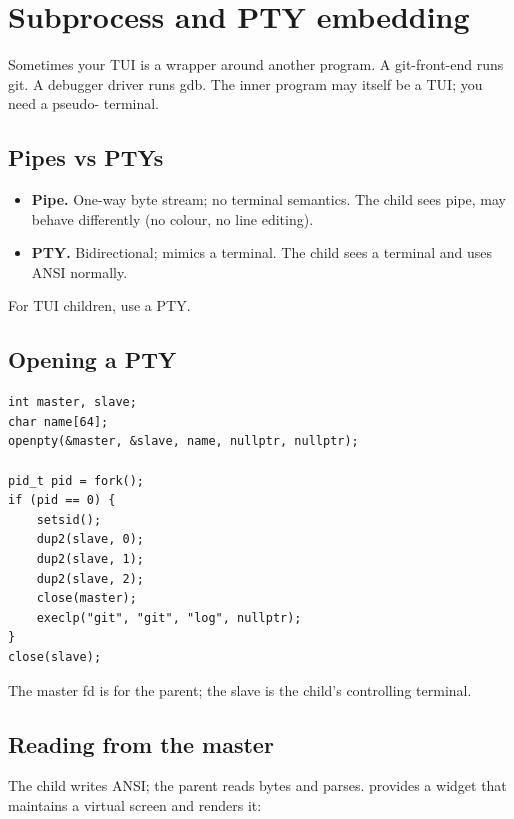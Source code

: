 \chapter{Subprocess and PTY embedding}
\label{ch:pty}

\begin{aside}
Sometimes your TUI is a wrapper around another program.
A git-front-end runs git. A debugger driver runs gdb. The
inner program may itself be a TUI; you need a pseudo-
terminal.
\end{aside}

\section{Pipes vs PTYs}

\begin{itemize}[leftmargin=*]
  \item \textbf{Pipe.} One-way byte stream; no terminal
    semantics. The child sees pipe, may behave differently
    (no colour, no line editing).
  \item \textbf{PTY.} Bidirectional; mimics a terminal. The
    child sees a terminal and uses ANSI normally.
\end{itemize}

For TUI children, use a PTY.

\section{Opening a PTY}

\begin{lstlisting}
int master, slave;
char name[64];
openpty(&master, &slave, name, nullptr, nullptr);

pid_t pid = fork();
if (pid == 0) {
    setsid();
    dup2(slave, 0);
    dup2(slave, 1);
    dup2(slave, 2);
    close(master);
    execlp("git", "git", "log", nullptr);
}
close(slave);
\end{lstlisting}

The master fd is for the parent; the slave is the child's
controlling terminal.

\section{Reading from the master}

The child writes ANSI; the parent reads bytes and parses.
\maya{} provides a  widget that
maintains a virtual screen and renders it:


